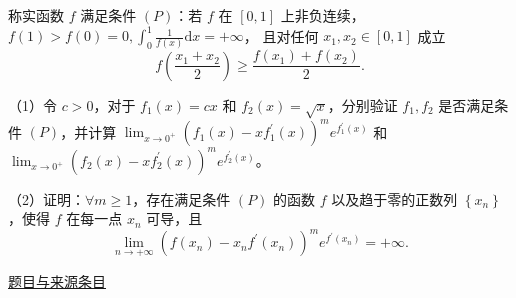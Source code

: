 \documentclass[12pt,fontset=fandol]{ctexart}
\begin{document}
\begin{example}[来源序号7]\label{ex:fin12-high:7}\label{pr:fin12-high:7}

称实函数 $f$ 满足条件 $(P)$：若 $f$ 在 $[0,1]$ 上非负连续，
$f(1)>f(0)=0,\int_{0}^{1}\frac{1}{f(x)}\mathrm{d}x=+\infty$，
且对任何 $x_{1},x_{2}\in[0,1]$ 成立
\[
f\left(\frac{x_{1}+x_{2}}{2}\right)\geq\frac{f\left(x_{1}\right)+f\left(x_{2}\right)}{2}.
\]

（1）令 $c>0$，对于 $f_{1}(x)=cx$ 和 $f_{2}(x)=\sqrt{x}$，分别验证 $f_{1},f_{2}$ 是否满足条件 $(P)$，并计算
$\lim_{x\to 0^{+}}\left(f_{1}(x)-xf_{1}^{\prime}(x)\right)^{m}e^{f_{1}^{\prime}(x)}$ 和 $\lim_{x\to 0^{+}}\left(f_{2}(x)-xf_{2}^{\prime}(x)\right)^{m}e^{f_{2}^{\prime}(x)}$。

（2）证明：$\forall m\geq 1$，存在满足条件 $(P)$ 的函数 $f$ 以及趋于零的正数列 $\left\{x_{n}\right\}$，使得 $f$ 在每一点 $x_{n}$ 可导，且
\[
\lim_{n\to+\infty}\left(f\left(x_{n}\right)-x_{n}f^{\prime}\left(x_{n}\right)\right)^{m}e^{f^{\prime}\left(x_{n}\right)}=+\infty.
\]

\par\href{https://github.com/lzxcr/cmc-mathematics/blob/64916fa1fdbc3e444a652eca204d5669058ee321/src/problems/finals/12/07.md}{题目与来源条目}

\end{example}
\end{document}
